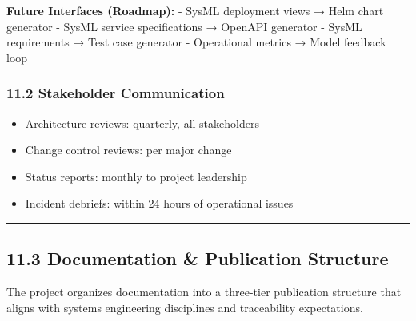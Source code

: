 \documentclass[12pt]{article}
\providecommand{\tightlist}{%
  \setlength{\itemsep}{0pt}\setlength{\parskip}{0pt}}
\begin{document}
\textbf{Future Interfaces (Roadmap):} - SysML deployment views → Helm
chart generator - SysML service specifications → OpenAPI generator -
SysML requirements → Test case generator - Operational metrics → Model
feedback loop

\subsubsection{11.2 Stakeholder
Communication}\label{stakeholder-communication}

\begin{itemize}
\tightlist
\item
  Architecture reviews: quarterly, all stakeholders
\item
  Change control reviews: per major change
\item
  Status reports: monthly to project leadership
\item
  Incident debriefs: within 24 hours of operational issues
\end{itemize}

\begin{center}\rule{0.5\linewidth}{0.5pt}\end{center}

\subsection{11.3 Documentation \& Publication
Structure}\label{documentation-publication-structure}

The project organizes documentation into a three-tier publication
structure that aligns with systems engineering disciplines and
traceability expectations.
\end{document}
